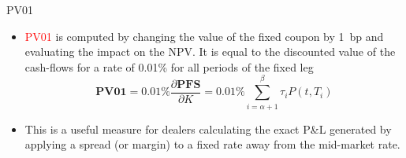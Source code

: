 \documentclass{beamer}
\begin{document}

\begin{frame}{PV01}
\begin{itemize}
	\item<1-> \textcolor{red}{PV01} is computed by changing the value of the fixed coupon by 1~bp and evaluating the impact on the NPV. It is equal to the discounted value of the cash-flows for a rate of 0.01\% for all periods of the fixed leg
	\begin{equation}
	\textbf{PV01} = 0.01\% \frac{\partial \textbf{PFS}}{\partial K} = 0.01\% \sum_{i=\alpha+1}^\beta\tau_iP(t,T_i)
	\end{equation}
	\item<2-> This is a useful measure for dealers calculating the exact P\&L generated by applying a spread (or margin) to a fixed rate away from the mid-market rate.
\end{itemize}
\end{frame}
\end{document}
